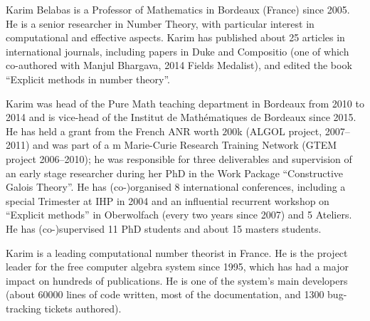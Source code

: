 \begin{participant}[type=PI,PM=12,salary=9800,gender=male]{Karim Belabas}
is a Professor of Mathematics in Bordeaux (France) since 2005. He is
a senior researcher in Number Theory, with particular interest in
computational and effective aspects. Karim has published about 25 articles
in international journals, including papers in Duke and Compositio (one of
which co-authored with Manjul Bhargava, 2014 Fields Medalist), and
edited the book ``Explicit methods in number theory''.

Karim was head of the Pure Math teaching department in Bordeaux from 2010 to
2014 and is vice-head of the Institut de Math\'ematiques de Bordeaux since
2015. He has held a grant from the French ANR worth \eur$200$k (ALGOL
project, 2007--2011) and was part of a m Marie-Curie Research
Training Network (GTEM project 2006--2010); he was responsible for three
deliverables and supervision of an early stage researcher during her PhD in
the Work Package ``Constructive Galois Theory''. He has (co-)organised 8
international conferences, including a special Trimester at IHP in 2004 and
an influential recurrent workshop on ``Explicit methods'' in Oberwolfach
(every two years since 2007) and 5 \PariGP Ateliers. He has (co-)supervised
11 PhD students and about 15 masters students.

Karim is a leading computational number theorist in France. He
is the project leader for the \PariGP free computer algebra system since
1995, which has had a major impact on hundreds of publications. He is one of
the system's main developers (about 60000 lines of code written, most of the
documentation, and 1300 bug-tracking tickets authored).
\end{participant}
